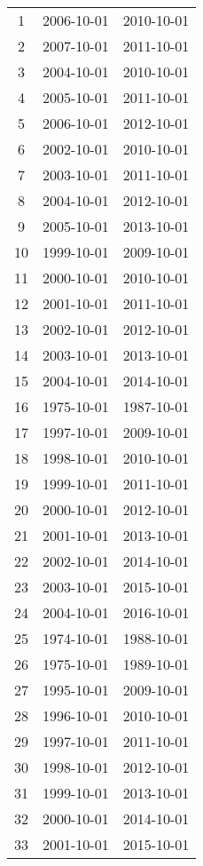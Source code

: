 % 
\begin{tabular}{ccc}
  \hline
  \hline
1 & 2006-10-01 & 2010-10-01 \\ 
  2 & 2007-10-01 & 2011-10-01 \\ 
  3 & 2004-10-01 & 2010-10-01 \\ 
  4 & 2005-10-01 & 2011-10-01 \\ 
  5 & 2006-10-01 & 2012-10-01 \\ 
  6 & 2002-10-01 & 2010-10-01 \\ 
  7 & 2003-10-01 & 2011-10-01 \\ 
  8 & 2004-10-01 & 2012-10-01 \\ 
  9 & 2005-10-01 & 2013-10-01 \\ 
  10 & 1999-10-01 & 2009-10-01 \\ 
  11 & 2000-10-01 & 2010-10-01 \\ 
  12 & 2001-10-01 & 2011-10-01 \\ 
  13 & 2002-10-01 & 2012-10-01 \\ 
  14 & 2003-10-01 & 2013-10-01 \\ 
  15 & 2004-10-01 & 2014-10-01 \\ 
  16 & 1975-10-01 & 1987-10-01 \\ 
  17 & 1997-10-01 & 2009-10-01 \\ 
  18 & 1998-10-01 & 2010-10-01 \\ 
  19 & 1999-10-01 & 2011-10-01 \\ 
  20 & 2000-10-01 & 2012-10-01 \\ 
  21 & 2001-10-01 & 2013-10-01 \\ 
  22 & 2002-10-01 & 2014-10-01 \\ 
  23 & 2003-10-01 & 2015-10-01 \\ 
  24 & 2004-10-01 & 2016-10-01 \\ 
  25 & 1974-10-01 & 1988-10-01 \\ 
  26 & 1975-10-01 & 1989-10-01 \\ 
  27 & 1995-10-01 & 2009-10-01 \\ 
  28 & 1996-10-01 & 2010-10-01 \\ 
  29 & 1997-10-01 & 2011-10-01 \\ 
  30 & 1998-10-01 & 2012-10-01 \\ 
  31 & 1999-10-01 & 2013-10-01 \\ 
  32 & 2000-10-01 & 2014-10-01 \\ 
  33 & 2001-10-01 & 2015-10-01 \\ 

\end{tabular}
